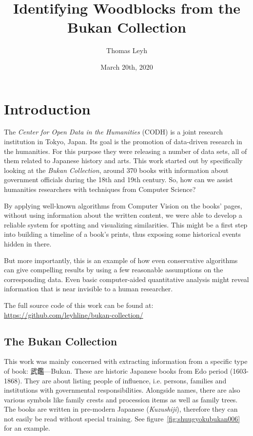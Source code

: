 \documentclass{ltjarticle}
\title{Identifying Woodblocks from the Bukan Collection}
\author{Thomas Leyh}
\date{March 20th, 2020}
\begin{document}
\maketitle

\section{Introduction}

The \emph{Center for Open Data in the Humanities} (CODH) is a joint research institution in Tokyo, Japan. Its goal is the promotion of data-driven research in the humanities.\cite{kitamoto2017codh} For this purpose they were releasing a number of data sets, all of them related to Japanese history and arts. This work started out by specifically looking at the \emph{Bukan Collection}\cite{codh2018bukan}, around 370 books with information about government officials during the 18th and 19th century. So, how can we assist humanities researchers with techniques from Computer Science?

By applying well-known algorithms from Computer Vision on the books' pages, without using information about the written content, we were able to develop a reliable system for spotting and visualizing similarities. This might be a first step into building a timeline of a book's prints, thus exposing some historical events hidden in there.

But more importantly, this is an example of how even conservative algorithms can give compelling results by using a few reasonable assumptions on the corresponding data. Even basic computer-aided quantitative analysis might reveal information that is near invisible to a human researcher.

The full source code of this work can be found at: \url{https://github.com/leyhline/bukan-collection/}

\subsection{The Bukan Collection}

This work was mainly concerned with extracting information from a specific type of book: 武鑑---Bukan. These are historic Japanese books from Edo period (1603-1868). They are about listing people of influence, i.e. persons, families and institutions with governmental responsibilities. Alongside names, there are also various symbols like family crests and procession items as well as family trees. The books are written in pre-modern Japanese (\emph{Kuzushiji}), therefore they can not easily be read without special training. See figure~\ref{fig:shuugyokubukan006} for an example.
\end{document}
